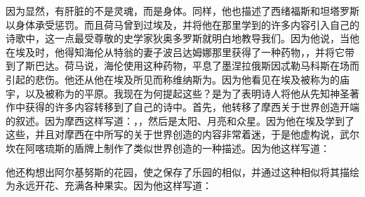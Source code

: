 因为显然，有肝脏的不是灵魂，而是身体。同样，他也描述了西绪福斯和坦塔罗斯以身体承受惩罚。而且荷马曾到过埃及，并将他在那里学到的许多内容引入自己的诗歌中，这一点最受尊敬的史学家狄奥多罗斯就明白地教导我们。因为他说，当他在埃及时，他得知海伦从特翁的妻子波吕达姆娜那里获得了一种药物，，并将它带到了斯巴达。荷马说，海伦使用这种药物，平息了墨涅拉俄斯因忒勒马科斯在场而引起的悲伤。他还从他在埃及所见而称维纳斯为。因为他看见在埃及被称为的庙宇，以及被称为的平原。我现在为何提起这些？是为了表明诗人将他从先知神圣著作中获得的许多内容转移到了自己的诗中。首先，他转移了摩西关于世界创造开端的叙述。因为摩西这样写道：，，然后是太阳、月亮和众星。因为他在埃及学到了这些，并且对摩西在中所写的关于世界创造的内容非常着迷，于是他虚构说，武尔坎在阿喀琉斯的盾牌上制作了类似世界创造的一种描述。因为他这样写道：\par

\par

他还构想出阿尔基努斯的花园，使之保存了乐园的相似，并通过这种相似将其描绘为永远开花、充满各种果实。因为他这样写道：\par

\par

